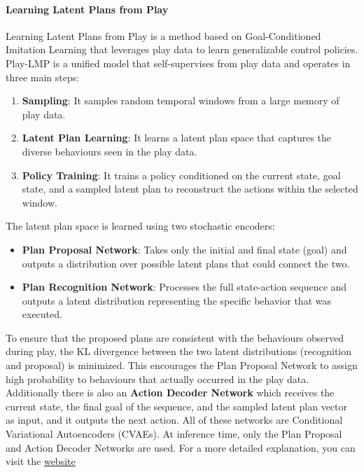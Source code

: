 \paragraph{Learning Latent Plans from Play}
Learning Latent Plans from Play \cite{lynch2019learninglatentplansplay} is a method based on Goal-Conditioned 
Imitation Learning that leverages play data to learn generalizable control policies.\newline
Play-LMP is a unified model that self-supervises from play data and operates in three main steps:
\begin{enumerate}
    \item \textbf{Sampling}: It samples random temporal windows from a large memory of play data.
    \item \textbf{Latent Plan Learning}: It learns a latent plan space that captures the diverse behaviours seen in the play data.
    \item \textbf{Policy Training}: It trains a policy conditioned on the current state, goal state, and a sampled latent plan to reconstruct 
    the actions within the selected window.
\end{enumerate}
The latent plan space is learned using two stochastic encoders:
\begin{itemize}
    \item \textbf{Plan Proposal Network}: Takes only the initial and final state (goal) and outputs a distribution over possible latent 
    plans that could connect the two.
    \item \textbf{Plan Recognition Network}: Processes the full state-action sequence and outputs a latent distribution representing the specific behavior that was executed.
\end{itemize}
To ensure that the proposed plans are consistent with the behaviours observed during play, the KL divergence between the two latent 
distributions (recognition and proposal) is minimized. This encourages the Plan Proposal Network to assign high probability to behaviours 
that actually occurred in the play data. Additionally there is also an \textbf{Action Decoder Network} which receives the current state, the 
final goal of the sequence, and the sampled latent plan vector as input, and it outputs the next action. All of these networks are 
Conditional Variational Autoencoders (CVAEs). \newline 
At inference time, only the Plan Proposal and Action Decoder Networks are used.
For a more detailed explanation, you can visit the \href{https://learning-from-play.github.io/}{website}

